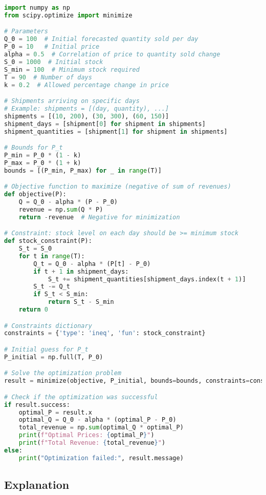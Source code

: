 \documentclass{article}
\begin{document}
\begin{lstlisting}[language=Python, caption=Python Code to Solve the Optimization Problem]
import numpy as np
from scipy.optimize import minimize

# Parameters
Q_0 = 100  # Initial forecasted quantity sold per day
P_0 = 10   # Initial price
alpha = 0.5  # Correlation of price to quantity sold change
S_0 = 1000  # Initial stock
S_min = 100  # Minimum stock required
T = 90  # Number of days
k = 0.2  # Allowed percentage change in price

# Shipments arriving on specific days
# Example: shipments = [(day, quantity), ...]
shipments = [(10, 200), (30, 300), (60, 150)]
shipment_days = [shipment[0] for shipment in shipments]
shipment_quantities = [shipment[1] for shipment in shipments]

# Bounds for P_t
P_min = P_0 * (1 - k)
P_max = P_0 * (1 + k)
bounds = [(P_min, P_max) for _ in range(T)]

# Objective function to maximize (negative of sum of revenues)
def objective(P):
    Q = Q_0 - alpha * (P - P_0)
    revenue = np.sum(Q * P)
    return -revenue  # Negative for minimization

# Constraint: stock level on each day should be >= minimum stock
def stock_constraint(P):
    S_t = S_0
    for t in range(T):
        Q_t = Q_0 - alpha * (P[t] - P_0)
        if t + 1 in shipment_days:
            S_t += shipment_quantities[shipment_days.index(t + 1)]
        S_t -= Q_t
        if S_t < S_min:
            return S_t - S_min
    return 0

# Constraints dictionary
constraints = {'type': 'ineq', 'fun': stock_constraint}

# Initial guess for P_t
P_initial = np.full(T, P_0)

# Solve the optimization problem
result = minimize(objective, P_initial, bounds=bounds, constraints=constraints)

# Check if the optimization was successful
if result.success:
    optimal_P = result.x
    optimal_Q = Q_0 - alpha * (optimal_P - P_0)
    total_revenue = np.sum(optimal_Q * optimal_P)
    print(f"Optimal Prices: {optimal_P}")
    print(f"Total Revenue: {total_revenue}")
else:
    print("Optimization failed:", result.message)
\end{lstlisting}

\subsection*{Explanation}
\end{document}
